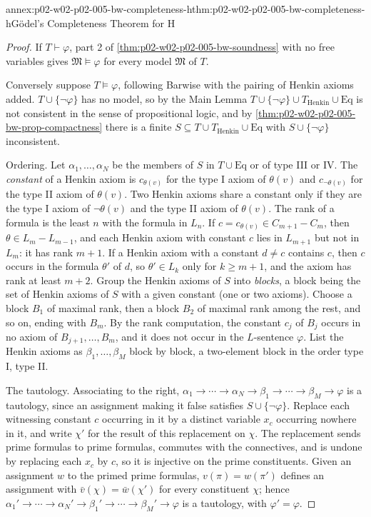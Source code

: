 \begin{annexitem}{annex:p02-w02-p02-005-bw-completeness-h}{thm:p02-w02-p02-005-bw-completeness-h}{G\"odel's Completeness Theorem for H}
\begin{proof}
If \(T\vdash\varphi\), part 2 of \cref{thm:p02-w02-p02-005-bw-soundness}
with no free variables gives \(\mathfrak M\models\varphi\) for every model
\(\mathfrak M\) of \(T\).

Conversely suppose \(T\models\varphi\), following Barwise
\cite[ch.~A.1, \S4, pp.~36--37]{Barwise1977FirstOrder} with the pairing of
Henkin axioms added.  \(T\cup\{\neg\varphi\}\) has no model, so by the Main
Lemma \(T\cup\{\neg\varphi\}\cup T_{\mathrm{Henkin}}\cup\mathrm{Eq}\) is not
consistent in the sense of propositional logic, and by
\cref{thm:p02-w02-p02-005-bw-prop-compactness} there is a finite
\(S\subseteq T\cup T_{\mathrm{Henkin}}\cup\mathrm{Eq}\) with
\(S\cup\{\neg\varphi\}\) inconsistent.

Ordering.  Let \(\alpha_1,\ldots,\alpha_N\) be the members of \(S\) in
\(T\cup\mathrm{Eq}\) or of type III or IV.  The \emph{constant} of a Henkin
axiom is \(c_{\theta(v)}\) for the type I axiom of \(\theta(v)\) and
\(c_{\neg\theta(v)}\) for the type II axiom of \(\theta(v)\).  Two Henkin
axioms share a constant only if they are the type I axiom of
\(\neg\theta(v)\) and the type II axiom of \(\theta(v)\).  The rank of a
formula is the least \(n\) with the formula in \(L_n\).  If
\(c=c_{\theta(v)}\in C_{m+1}-C_m\), then \(\theta\in L_m-L_{m-1}\), and each
Henkin axiom with constant \(c\) lies in \(L_{m+1}\) but not in \(L_m\): it
has rank \(m+1\).  If a Henkin axiom with a constant \(d\neq c\) contains
\(c\), then \(c\) occurs in the formula \(\theta'\) of \(d\), so
\(\theta'\in L_k\) only for \(k\geq m+1\), and the axiom has rank at least
\(m+2\).  Group the Henkin axioms of \(S\) into \emph{blocks}, a block being
the set of Henkin axioms of \(S\) with a given constant (one or two
axioms).  Choose a block \(B_1\) of maximal rank, then a block \(B_2\) of
maximal rank among the rest, and so on, ending with \(B_m\).  By the rank
computation, the constant \(c_j\) of \(B_j\) occurs in no axiom of
\(B_{j+1},\ldots,B_m\), and it does not occur in the \(L\)-sentence
\(\varphi\).  List the Henkin axioms as \(\beta_1,\ldots,\beta_M\) block by
block, a two-element block in the order type I, type II.

The tautology.  Associating to the right,
\(\alpha_1\to\cdots\to\alpha_N\to\beta_1\to\cdots\to\beta_M\to\varphi\) is
a tautology, since an assignment making it false satisfies
\(S\cup\{\neg\varphi\}\).  Replace each witnessing constant \(c\) occurring
in it by a distinct variable \(x_c\) occurring nowhere in it, and write
\(\chi'\) for the result of this replacement on \(\chi\).  The replacement
sends prime formulas to prime formulas, commutes with the connectives, and
is undone by replacing each \(x_c\) by \(c\), so it is injective on the
prime constituents.  Given an assignment \(w\) to the primed prime
formulas, \(v(\pi)=w(\pi')\) defines an assignment with
\(\bar v(\chi)=\bar w(\chi')\) for every constituent \(\chi\); hence
\(\alpha_1'\to\cdots\to\alpha_N'\to\beta_1'\to\cdots\to\beta_M'\to\varphi\)
is a tautology, with \(\varphi'=\varphi\).


\end{proof}
\end{annexitem}
